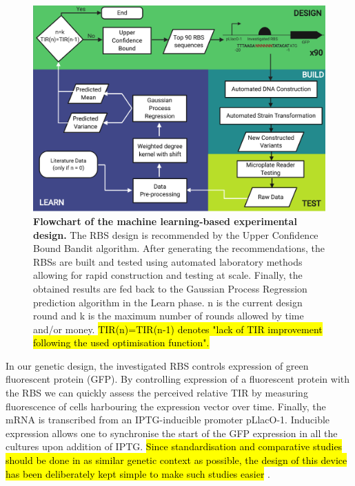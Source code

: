 \documentclass{article}
\begin{document}
\begin{figure}[h]
    \centering
    \includegraphics[scale=0.7]{plots/Main_Paper/flowchart.pdf}
    \caption{\textbf{Flowchart of the machine learning-based experimental design.} The RBS design is recommended by the Upper Confidence Bound Bandit algorithm. After generating the recommendations, the RBSs are built and tested using automated laboratory methods allowing for rapid construction and testing at scale. Finally, the obtained results are fed back to the Gaussian Process Regression prediction algorithm in the Learn phase. n is the current design round and k is the maximum number of rounds allowed by time and/or money. \hl{TIR(n)=TIR(n-1) denotes "lack of TIR improvement following the used optimisation function".}}
    \label{fig: Flowchart}
\end{figure}

In our genetic design, the investigated RBS controls expression of green fluorescent protein (GFP). 
By controlling expression of a fluorescent protein with the RBS we can quickly assess the perceived relative TIR by measuring fluorescence of cells harbouring the expression vector over time.
Finally, the mRNA is transcribed from an IPTG-inducible promoter pLlacO-1. 
Inducible expression allows one to synchronise the start of the GFP expression in all the cultures upon addition of IPTG.
\hl{Since standardisation and comparative studies should be done in as similar genetic context as possible, the design of this device has been deliberately kept simple to make such studies easier} \cite{Beal2021}.\\
\end{document}
